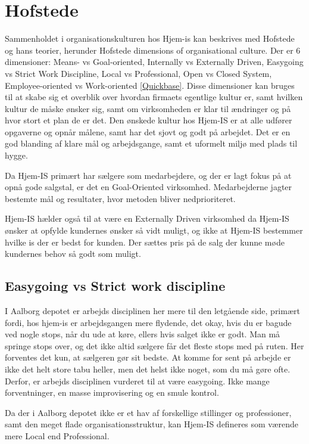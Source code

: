 \section{Hofstede}
Sammenholdet i organisationskulturen hos Hjem-is kan beskrives med Hofstede og hans teorier, herunder Hofstede dimensions of organisational culture. Der er 6 dimensioner: Means- vs Goal-oriented, Internally vs Externally Driven, Easygoing vs Strict Work Discipline, Local vs Professional, Open vs Closed System, Employee-oriented vs Work-oriented \ref{Quickbase}. Disse dimensioner kan bruges til at skabe sig et overblik over hvordan firmaets egentlige kultur er, samt hvilken kultur de måske ønsker sig, samt om virksomheden er klar til ændringer og på hvor stort et plan de er det. Den ønskede kultur hos Hjem-IS er at alle udfører opgaverne og opnår målene, samt har det sjovt og godt på arbejdet. Det er en god blanding af klare mål og arbejdsgange, samt et uformelt miljø med plads til hygge.

Da Hjem-IS primært har sælgere som medarbejdere, og der er lagt fokus på at opnå gode salgstal, er det en Goal-Oriented virksomhed. Medarbejderne jagter bestemte mål og resultater, hvor metoden bliver nedprioriteret.

Hjem-IS hælder også til at være en Externally Driven virksomhed da Hjem-IS ønsker at opfylde kundernes ønsker så vidt muligt, og ikke at Hjem-IS bestemmer hvilke is der er bedst for kunden. Der sættes pris på de salg der kunne møde kundernes behov så godt som muligt.

\subsection{Easygoing vs Strict work discipline}
I Aalborg depotet er arbejds disciplinen her mere til den letgående side, primært fordi, hos hjem-is er arbejdsgangen mere flydende, det okay, hvis du er bagude ved nogle stops, når du ude at køre, ellers hvis salget ikke er godt. Man må springe stops over, og det ikke altid sælgere får det fleste stops med på ruten. Her forventes det kun, at sælgeren gør sit bedste. At komme for sent på arbejde er ikke det helt store tabu heller, men det helst ikke noget, som du må gøre ofte. Derfor, er arbejds disciplinen vurderet til at være easygoing. Ikke mange forventninger, en masse improvisering og en smule kontrol.

Da der i Aalborg depotet ikke er et hav af forskellige stillinger og professioner, samt den meget flade organisationsstruktur, kan Hjem-IS defineres som værende mere Local end Professional.

